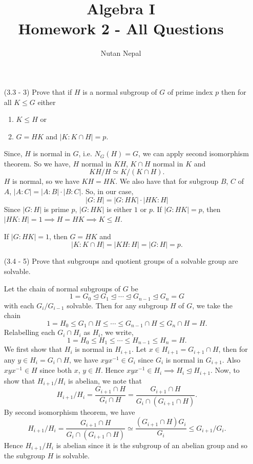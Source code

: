 \documentclass[12pt]{article}
\title{Algebra I\\
\large Homework 2 - All Questions
}
\author{Nutan Nepal}
\begin{document}
\maketitle
\makebox[\linewidth]{\rule{190mm}{.5pt}}
\vspace{0mm}
\begin{enumerate}

\item[(3.3 - 3)] Prove that if $H$ is a normal subgroup
    of $G$ of prime index $p$ then for all $K\leq G$
    either
    \begin{enumerate}
        \item $K\leq H$ or
        \item $G=HK$ and $|K:K\cap H|=p$.
    \end{enumerate}
\begin{mybox}
       
    Since, $H$ is normal in $G$, i.e. $N_G(H)=G$,
    we can apply second isomorphism theorem.
    So we have, $H$ normal in $KH$, $K\cap H$
    normal in $K$ and
    $$KH/H\simeq K/(K\cap H).$$
    $H$ is normal, so we have $KH=HK$.
    We also have that for subgroup $B$,
    $C$ of $A$,
    $|A:C|=|A:B|\cdot|B:C|$. So, in our case,
    $$|G:H|=|G:HK|\cdot|HK:H|$$
    Since $|G:H|$ is prime $p$, $|G:HK|$ is either
    $1$ or $p$.
    If $|G:HK|=p$, then $|HK:H|=1\implies
    H=HK\implies K\leq H$.

    \vspace*{3mm}
    If $|G:HK|=1$, then $G=HK$ and
    $$|K:K\cap H|=|KH:H|=|G:H|=p.$$
\end{mybox}

\item[(3.4 - 5)] Prove that subgroups and quotient
    groups of a solvable group are solvable.

\begin{mybox}

    Let the chain of normal subgroups of $G$
    be
    $$1=G_0\trianglelefteq G_1
    \trianglelefteq \cdots 
    \trianglelefteq G_{n-1}
    \trianglelefteq G_n=G$$
    with each $G_i/G_{i-1}$ solvable. Then for any
    subgroup $H$ of $G$, we take the chain
    $$1=H_0\leq G_1 \cap H
    \leq \cdots 
    \leq G_{n-1} \cap H
    \leq G_n\cap H=H.$$
    Relabelling each $G_i\cap H_i$ as $H_i$, we write,
    $$1=H_0\leq H_1
    \leq \cdots 
    \leq H_{n-1}
    \leq H_n=H.$$
    We first show that $H_i$ is normal
    in $H_{i+1}$. Let $x\in H_{i+1}=G_{i+1}\cap
    H$, then for any $y\in H_i=G_i\cap H$, we have
    $xyx^{-1}\in G_i$ since $G_i$ is normal in
    $G_{i+1}$. Also $xyx^{-1}\in H$ since both $x$,
    $y\in H$. Hence $xyx^{-1}\in H_i\implies
    H_i\trianglelefteq H_{i+1}$.
    Now, to show that $H_{i+1}/H_i$ is abelian,
    we note that
    $$H_{i+1}/H_i=\frac
    {G_{i+1}\cap H}{G_i\cap H}
    =\frac
    {G_{i+1}\cap H}{G_i\cap(G_{i+1}\cap H)}.$$
    By second isomorphism theorem, we have 
    $$H_{i+1}/H_i= \frac
    {G_{i+1}\cap H}{G_i\cap(G_{i+1}\cap H)}
    \simeq \frac
    {(G_{i+1}\cap H)G_i}{G_i}
    \leq G_{i+1}/G_i.$$
    Hence $H_{i+1}/H_i$ is abelian since it is the
    subgroup of an abelian group and so the
    subgroup $H$ is solvable.


\end{mybox}
\end{enumerate}
\end{document}

